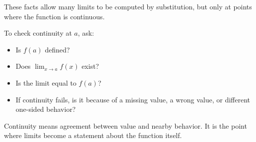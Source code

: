 These facts allow many limits to be computed by substitution, but only at points where the function is continuous.

\begin{summarybox}
To check continuity at \(a\), ask:
\begin{itemize}
\item Is \(f(a)\) defined?
\item Does \(\lim_{x\to a}f(x)\) exist?
\item Is the limit equal to \(f(a)\)?
\item If continuity fails, is it because of a missing value, a wrong value, or different one-sided behavior?
\end{itemize}
\end{summarybox}

Continuity means agreement between value and nearby behavior. It is the point where limits become a statement about the function itself.